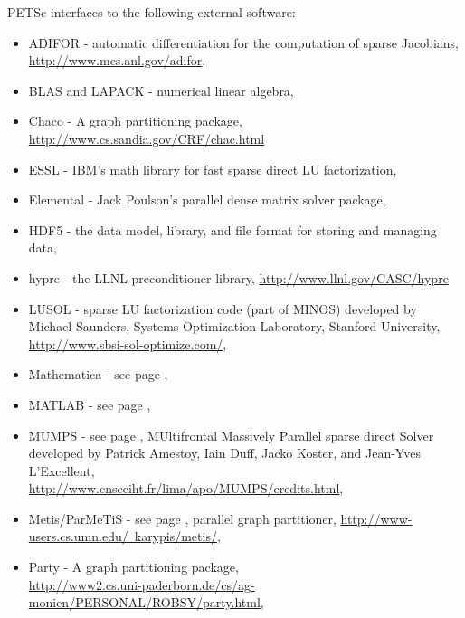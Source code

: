 \vspace{.3in}
\noindent
PETSc interfaces to the following external software:
\begin{itemize}
  \item ADIFOR -  automatic differentiation for the computation of sparse Jacobians,\\
                     \href{http://www.mcs.anl.gov/adifor}{http://www.mcs.anl.gov/adifor},
  \item BLAS and LAPACK - numerical linear algebra,
  \item Chaco -     A graph partitioning package, \href{ http://www.cs.sandia.gov/CRF/chac.html}{ http://www.cs.sandia.gov/CRF/chac.html}
  \item ESSL -         IBM's math library for fast sparse direct LU factorization,
  \item Elemental -  Jack Poulson's parallel dense matrix solver package,
  \item HDF5 - the data model, library, and file format for storing and managing data,
  \item hypre -    the LLNL preconditioner library, \href{http://www.llnl.gov/CASC/hypre}{http://www.llnl.gov/CASC/hypre}
  \item LUSOL -       sparse LU factorization code (part of MINOS) developed by Michael Saunders,
                      Systems Optimization Laboratory, Stanford University,
                     \href{http://www.sbsi-sol-optimize.com/}{http://www.sbsi-sol-optimize.com/},
  \item Mathematica -  see page \pageref{ch_mathematica},
  \item MATLAB -      see page \pageref{ch_matlab},
  \item MUMPS -      see page \pageref{sec_externalsol}, MUltifrontal Massively Parallel sparse direct Solver developed by Patrick Amestoy,
                     Iain Duff, Jacko Koster, and Jean-Yves L'Excellent, \\
                     \href{http://www.enseeiht.fr/lima/apo/MUMPS/credits.html}{http://www.enseeiht.fr/lima/apo/MUMPS/credits.html},
  \item Metis/ParMeTiS - see page \pageref{sec_partitioning}, parallel graph partitioner,
                     \href{http://www-users.cs.umn.edu/~karypis/metis/}{http://www-users.cs.umn.edu/~karypis/metis/},
  \item Party -     A graph partitioning package, \\ 
               \href{http://www2.cs.uni-paderborn.de/cs/ag-monien/PERSONAL/ROBSY/party.html}{http://www2.cs.uni-paderborn.de/cs/ag-monien/PERSONAL/ROBSY/party.html},

\end{itemize}
